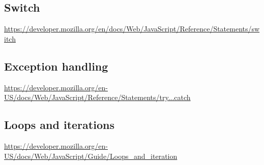 \subsection{Switch}
\url{https://developer.mozilla.org/en/docs/Web/JavaScript/Reference/Statements/switch}

\subsection{Exception handling}
\url{https://developer.mozilla.org/en-US/docs/Web/JavaScript/Reference/Statements/try...catch}

\subsection{Loops and iterations}
\url{https://developer.mozilla.org/en-US/docs/Web/JavaScript/Guide/Loops_and_iteration}

